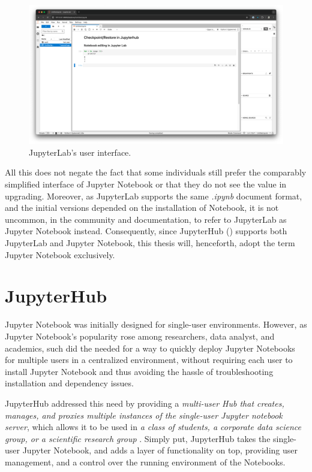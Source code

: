 \documentclass[
  digital,     %
  oneside,     %
  nosansbold,  %
  nocolorbold, %
  lof,         %
  lot,         %
]{fithesis4}
\begin{document}
\begin{figure}[H]
  \begin{center}
  \includegraphics[width=\textwidth]{figures/jupyter-lab-extended-screenshot.png}
  \end{center}
  \caption{JupyterLab's user interface.}
  \label{fig:jupyter-lab-screenshot}
\end{figure}

All this does not negate the fact that some individuals still prefer the comparably simplified interface of Jupyter Notebook or that they do not see the value in upgrading. Moreover, as JupyterLab supports the same \emph{.ipynb} document format, and the initial versions depended on the installation of Notebook, it is not uncommon, in the community and documentation, to refer to JupyterLab as Jupyter Notebook instead. Consequently, since JupyterHub () supports both JupyterLab and Jupyter Notebook, this thesis will, henceforth, adopt the term Jupyter Notebook exclusively.

\section{JupyterHub}
\label{sec:jupyterhub}
Jupyter Notebook was initially designed for single-user environments. However, as Jupyter Notebook's popularity rose among researchers, data analyst, and academics, such did the needed for a way to quickly deploy Jupyter Notebooks for multiple users in a centralized environment, without requiring each user to install Jupyter Notebook and thus avoiding the hassle of troubleshooting installation and dependency issues.

JupyterHub addressed this need by providing a \emph{multi-user Hub that creates, manages, and proxies multiple instances of the single-user Jupyter notebook server}, which allows it to be used in \emph{a class of students, a corporate data science group, or a scientific research group} \cite{jupyterhub}. Simply put, JupyterHub takes the single-user Jupyter Notebook, and adds a layer of functionality on top, providing user management, and a control over the running environment of the Notebooks.
\end{document}
